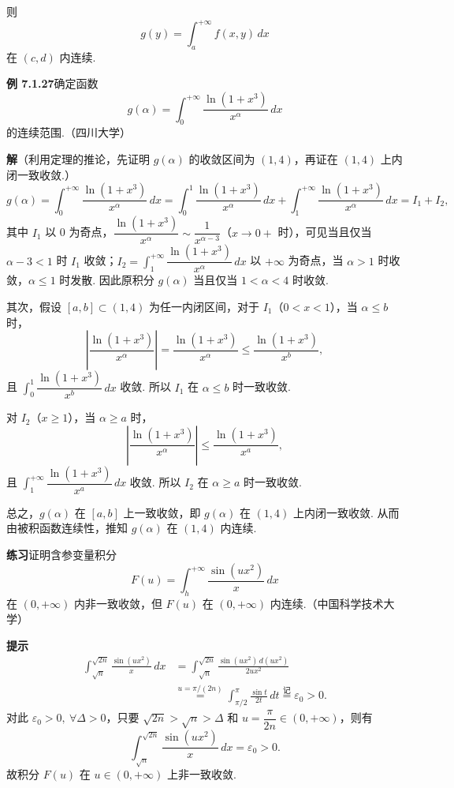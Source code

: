 \documentclass[UTF8,12pt,a4paper,fontset=fandol]{ctexart}
\begin{document}
则
\[
g(y)=\int_a^{+\infty}f(x,y)\,dx
\]
在 $(c,d)$ 内连续.

\noindent\textbf{例 7.1.27}\quad 确定函数
\[
g(\alpha)=\int_0^{+\infty}\frac{\ln(1+x^3)}{x^\alpha}\,dx
\]
的连续范围.（四川大学）

\noindent\textbf{解}\quad （利用定理的推论，先证明 $g(\alpha)$ 的收敛区间为 $(1,4)$，再证在 $(1,4)$ 上内闭一致收敛.）
\[
g(\alpha)=\int_0^{+\infty}\frac{\ln(1+x^3)}{x^\alpha}\,dx
=\int_0^1\frac{\ln(1+x^3)}{x^\alpha}\,dx+\int_1^{+\infty}\frac{\ln(1+x^3)}{x^\alpha}\,dx
=I_1+I_2,
\]
其中 $I_1$ 以 0 为奇点，$\dfrac{\ln(1+x^3)}{x^\alpha}\sim\dfrac1{x^{\alpha-3}}$（$x\to0+$ 时），可见当且仅当 $\alpha-3<1$ 时 $I_1$ 收敛；$I_2=\displaystyle\int_1^{+\infty}\dfrac{\ln(1+x^3)}{x^\alpha}\,dx$ 以 $+\infty$ 为奇点，当 $\alpha>1$ 时收敛，$\alpha\le1$ 时发散. 因此原积分 $g(\alpha)$ 当且仅当 $1<\alpha<4$ 时收敛.

其次，假设 $[a,b]\subset(1,4)$ 为任一内闭区间，对于 $I_1$（$0<x<1$），当 $\alpha\le b$ 时，
\[
\left|\frac{\ln(1+x^3)}{x^\alpha}\right|
=\frac{\ln(1+x^3)}{x^\alpha}
\le\frac{\ln(1+x^3)}{x^b},
\]
且 $\displaystyle\int_0^1\dfrac{\ln(1+x^3)}{x^b}\,dx$ 收敛. 所以 $I_1$ 在 $\alpha\le b$ 时一致收敛.

对 $I_2$（$x\ge1$），当 $\alpha\ge a$ 时，
\[
\left|\frac{\ln(1+x^3)}{x^\alpha}\right|
\le\frac{\ln(1+x^3)}{x^a},
\]
且 $\displaystyle\int_1^{+\infty}\dfrac{\ln(1+x^3)}{x^a}\,dx$ 收敛. 所以 $I_2$ 在 $\alpha\ge a$ 时一致收敛.

总之，$g(\alpha)$ 在 $[a,b]$ 上一致收敛，即 $g(\alpha)$ 在 $(1,4)$ 上内闭一致收敛. 从而由被积函数连续性，推知 $g(\alpha)$ 在 $(1,4)$ 内连续.

\noindent\textbf{练习}\quad 证明含参变量积分
\[
F(u)=\int_h^{+\infty}\frac{\sin(ux^2)}{x}\,dx
\]
在 $(0,+\infty)$ 内非一致收敛，但 $F(u)$ 在 $(0,+\infty)$ 内连续.（中国科学技术大学）

\noindent\textbf{提示}\quad
\[
\begin{aligned}
\int_{\sqrt n}^{\sqrt{2n}}\frac{\sin(ux^2)}{x}\,dx
&=\int_{\sqrt n}^{\sqrt{2n}}\frac{\sin(ux^2)\,d(ux^2)}{2ux^2}\\
&\overset{u=\pi/(2n)}{=}\int_{\pi/2}^{\pi}\frac{\sin t}{2t}\,dt
\overset{\text{记}}{=}\varepsilon_0>0.
\end{aligned}
\]
对此 $\varepsilon_0>0,\ \forall\Delta>0$，只要 $\sqrt{2n}>\sqrt n>\Delta$ 和 $u=\dfrac{\pi}{2n}\in(0,+\infty)$，则有
\[
\int_{\sqrt n}^{\sqrt{2n}}\frac{\sin(ux^2)}{x}\,dx=\varepsilon_0>0.
\]
故积分 $F(u)$ 在 $u\in(0,+\infty)$ 上非一致收敛.
\end{document}
